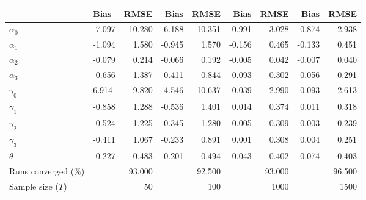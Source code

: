 
\begin{tabular}[t]{llrrrrrrr}
\toprule
  & Bias & RMSE & Bias & RMSE & Bias & RMSE & Bias & RMSE\\
\midrule
$\alpha_{0}$ & -7.097 & 10.280 & -6.188 & 10.351 & -0.991 & 3.028 & -0.874 & 2.938\\
$\alpha_{1}$ & -1.094 & 1.580 & -0.945 & 1.570 & -0.156 & 0.465 & -0.133 & 0.451\\
$\alpha_{2}$ & -0.079 & 0.214 & -0.066 & 0.192 & -0.005 & 0.042 & -0.007 & 0.040\\
$\alpha_{3}$ & -0.656 & 1.387 & -0.411 & 0.844 & -0.093 & 0.302 & -0.056 & 0.291\\
$\gamma_{0}$ & 6.914 & 9.820 & 4.546 & 10.637 & 0.039 & 2.990 & 0.093 & 2.613\\
$\gamma_{1}$ & -0.858 & 1.288 & -0.536 & 1.401 & 0.014 & 0.374 & 0.011 & 0.318\\
$\gamma_{2}$ & -0.524 & 1.225 & -0.345 & 1.280 & -0.005 & 0.309 & 0.003 & 0.239\\
$\gamma_{3}$ & -0.411 & 1.067 & -0.233 & 0.891 & 0.001 & 0.308 & 0.004 & 0.251\\
$\theta$ & -0.227 & 0.483 & -0.201 & 0.494 & -0.043 & 0.402 & -0.074 & 0.403\\
Runs converged (\%) &  & 93.000 &  & 92.500 &  & 93.000 &  & 96.500\\
Sample size ($T$) &  & 50 &  & 100 &  & 1000 &  & 1500\\
\bottomrule
\end{tabular}
